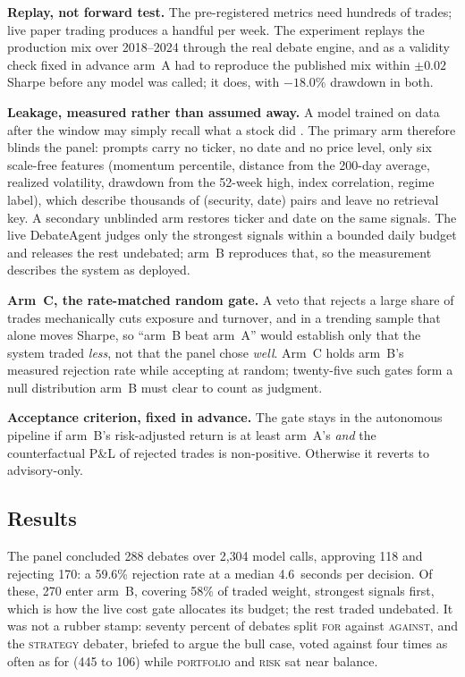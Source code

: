 \documentclass[conference]{IEEEtran}
\begin{document}
\textbf{Replay, not forward test.} The pre-registered metrics need hundreds of
trades; live paper trading produces a handful per week. The experiment replays
the production mix over 2018--2024 through the real debate engine, and as a
validity check fixed in advance arm~A had to reproduce the published mix within
$\pm 0.02$ Sharpe before any model was called; it does, with $-18.0\%$ drawdown
in both.

\textbf{Leakage, measured rather than assumed away.} A model trained on data
after the window may simply recall what a stock did
\cite{glasserman2023lookahead}. The primary arm
therefore blinds the panel: prompts carry no ticker, no date and no price
level, only six scale-free features (momentum percentile, distance from the
200-day average, realized volatility, drawdown from the 52-week high, index
correlation, regime label), which describe thousands of (security, date) pairs
and leave no retrieval key. A secondary unblinded arm restores ticker and date
on the same signals. The live DebateAgent judges only the strongest signals
within a bounded daily budget and releases the rest undebated; arm~B reproduces
that, so the measurement describes the system as deployed.

\textbf{Arm~C, the rate-matched random gate.} A veto that rejects a large share
of trades mechanically cuts exposure and turnover, and in a trending sample
that alone moves Sharpe, so ``arm~B beat arm~A'' would establish only that the
system traded \emph{less}, not that the panel chose \emph{well}. Arm~C holds
arm~B's measured rejection rate while accepting at random; twenty-five such
gates form a null distribution arm~B must clear to count as judgment.

\textbf{Acceptance criterion, fixed in advance.} The gate stays in the
autonomous pipeline if arm~B's risk-adjusted return is at least arm~A's
\emph{and} the counterfactual P\&L of rejected trades is non-positive.
Otherwise it reverts to advisory-only.

\subsection{Results}
\label{sec:abresults}

The panel concluded 288 debates over 2{,}304 model calls, approving 118 and
rejecting 170: a 59.6\% rejection rate at a median 4.6~seconds per decision. Of
these, 270 enter arm~B, covering 58\% of traded weight, strongest signals
first, which is how the live cost gate allocates its budget; the rest traded
undebated. It was not a rubber stamp: seventy percent of debates split
\textsc{for} against \textsc{against}, and the
\textsc{strategy} debater, briefed to argue the bull case, voted against four
times as often as for (445 to 106) while \textsc{portfolio} and \textsc{risk}
sat near balance.
\end{document}
